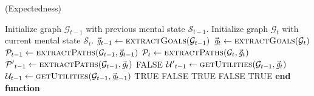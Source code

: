 \documentclass{article}
\begin{document}
\pagebreak

\begin{algorithm}
	\caption{(Expectedness)}
	\label{array-sum}
	\begin{algorithmic}[1]
			\Statex
			\State Initialize graph $\mathcal{G}_{t-1}$ with previous mental state
			$\mathcal{S}_{t-1}$.
			\State Initialize graph $\mathcal{G}_{t}$ with current mental state
			$\mathcal{S}_{t}$.
			\Statex
			\State $\vec{\mathit{g}}_{t-1} \gets \Call{extractGoals}{\mathcal{G}_{t-1}}$
			\State $\vec{\mathit{g}}_{t} \gets \Call{extractGoals}{\mathcal{G}_{t}}$
			\Statex
			\State $\mathcal{P}_{t-1} \gets
			\Call{extractPaths}{\mathcal{G}_{t-1}, \vec{\mathit{g}}_{t-1}}$
			\State $\mathcal{P}_{t} \gets \Call{extractPaths}{\mathcal{G}_{t},
			\vec{\mathit{g}}_{t}}$
			\Statex
						\State $\mathcal{P'}_{t-1} \gets \Call{extractPaths}{\mathcal{G}_{t-1},
						\vec{\mathit{g}}_{t}}$
							\State \Return FALSE
						\Else
							\State $\mathcal{U'}_{t-1} \gets \Call{getUtilities}{\mathcal{G}_{t-1},
							\vec{\mathit{g}}_{t}}$
							\State $\mathcal{U}_{t-1} \gets \Call{getUtilities}{\mathcal{G}_{t-1},
							\vec{\mathit{g}}_{t-1}}$
								\State \Return TRUE
							\Else
								\State \Return FALSE
							\EndIf
						\EndIf
					\Else {}
						\State \Return TRUE
					\EndIf
				\Else {}
				\State \Return FALSE
				\EndIf
			\Else {}
				\State \Return TRUE
			\EndIf
		\EndFunction
		\State \textbf{end function}
	\end{algorithmic}
\end{algorithm}
\end{document}
